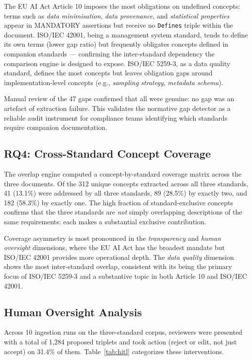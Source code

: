 The EU AI Act Article 10 imposes the most obligations on undefined concepts: terms such as \emph{data minimisation}, \emph{data provenance}, and \emph{statistical properties} appear in MANDATORY assertions but receive no \texttt{Defines} triple within the document. ISO/IEC 42001, being a management system standard, tends to define its own terms (lower gap ratio) but frequently obligates concepts defined in companion standards — confirming the inter-standard dependency the comparison engine is designed to expose. ISO/IEC 5259-3, as a data quality standard, defines the most concepts but leaves obligation gaps around implementation-level concepts (e.g., \emph{sampling strategy}, \emph{metadata schema}).

Manual review of the 47 gaps confirmed that all were genuine: no gap was an artefact of extraction failure. This validates the normative gap detector as a reliable audit instrument for compliance teams identifying which standards require companion documentation.

\subsection{RQ4: Cross-Standard Concept Coverage}

The overlap engine computed a concept-by-standard coverage matrix across the three documents. Of the 312 unique concepts extracted across all three standards, 41 (13.1\%) were addressed by all three standards, 89 (28.5\%) by exactly two, and 182 (58.3\%) by exactly one. The high fraction of standard-exclusive concepts confirms that the three standards are \emph{not} simply overlapping descriptions of the same requirements: each makes a substantial exclusive contribution.

Coverage asymmetry is most pronounced in the \emph{transparency} and \emph{human oversight} dimensions, where the EU AI Act has the broadest mandate but ISO/IEC 42001 provides more operational depth. The \emph{data quality} dimension shows the most inter-standard overlap, consistent with its being the primary focus of ISO/IEC 5259-3 and a substantive topic in both Article 10 and ISO/IEC 42001.

\subsection{Human Oversight Analysis}

Across 10 ingestion runs on the three-standard corpus, reviewers were presented with a total of 1,284 proposed triplets and took action (reject or edit, not just accept) on 31.4\% of them. Table~\ref{tab:hitl} categorizes these interventions.

